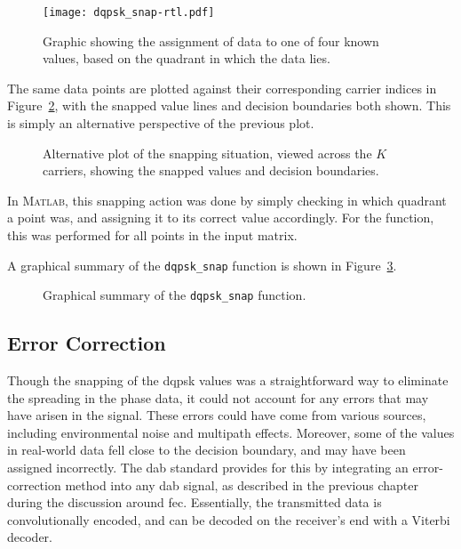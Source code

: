 \documentclass[class=report,11pt,crop=false]{standalone}
\begin{document}
\begin{figure}[htbp]
  \centering
  \captionsetup{type=figure}
  \texttt{[image: dqpsk\_snap-rtl.pdf]}
  \caption{Graphic showing the assignment of  data to one of four known values, based on the quadrant in which the data lies.}
  \label{fig:dqpsk_snap_rtl}
\end{figure}

The same data points are plotted against their corresponding carrier indices in Figure~\ref{fig:dqpsk_snap_rtl-alt}, with the snapped value lines and decision boundaries both shown. This is simply an alternative perspective of the previous plot.

\begin{figure}[htbp]
  \centering
  \captionsetup{type=figure}
  \def\svgwidth{\linewidth}
  { %
      }
  \caption{Alternative plot of the  snapping situation, viewed across the \(K\) carriers, showing the snapped values and decision boundaries.}
  \label{fig:dqpsk_snap_rtl-alt}
\end{figure}

In \textsc{Matlab}, this snapping action was done by simply checking in which quadrant a point was, and assigning it to its correct value accordingly. For the function, this was performed for all points in the input matrix.

A graphical summary of the \texttt{dqpsk\_snap} function is shown in Figure~\ref{fig:dqpsk_snap}.

\begin{figure}[htbp]
  \centering
  \captionsetup{type=figure}
  \def\svgwidth{\linewidth}
  { %
      }
      \caption{Graphical summary of the \texttt{dqpsk\_snap} function.}
  \label{fig:dqpsk_snap}
\end{figure}

\subsection{Error Correction \label{subsect:dab-proc_error-correct}}
Though the snapping of the \gls{dqpsk} values was a straightforward way to eliminate the spreading in the phase data, it could not account for any errors that may have arisen in the signal. These errors could have come from various sources, including environmental noise and multipath effects. Moreover, some of the values in real-world data fell close to the decision boundary, and may have been assigned incorrectly. The \gls{dab} standard provides for this by integrating an error-correction method into any \gls{dab} signal, as described in the previous chapter during the discussion around \gls{fec}. Essentially, the transmitted data is convolutionally encoded, and can be decoded on the receiver's end with a Viterbi decoder.
\end{document}
